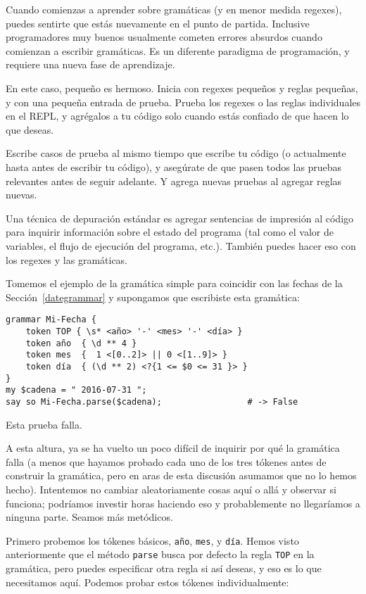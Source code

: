 Cuando comienzas a aprender sobre gramáticas (y en menor medida regexes),
puedes sentirte que estás nuevamente en el punto de partida. Inclusive
programadores muy buenos usualmente cometen errores absurdos cuando
comienzan a escribir gramáticas. Es un diferente paradigma de programación,
y requiere una nueva fase de aprendizaje.

En este caso, pequeño es hermoso. Inicia con regexes pequeños y reglas pequeñas,
y con una pequeña entrada de prueba. Prueba los regexes o las reglas individuales
en el REPL, y agrégalos a tu código solo cuando estás confiado
de que hacen lo que deseas.

Escribe casos de prueba al mismo tiempo que escribe tu código 
(o actualmente hasta antes de escribir tu código), y asegúrate de
que pasen todos las pruebas relevantes antes de seguir adelante.
Y agrega nuevas pruebas al agregar reglas nuevas.


Una técnica de depuración estándar es agregar sentencias de 
impresión al código para inquirir información sobre el estado
del programa (tal como el valor de variables, el flujo de
ejecución del programa, etc.). También puedes hacer eso con
los regexes y las gramáticas.

Tomemos el ejemplo de la gramática simple para coincidir
con las fechas de la Sección~\ref{dategrammar} y supongamos
que escribiste esta gramática:

\begin{verbatim}
grammar Mi-Fecha {
    token TOP { \s* <año> '-' <mes> '-' <día> }
    token año  { \d ** 4 }                                        
    token mes  {  1 <[0..2]> || 0 <[1..9]> }                
    token día  { (\d ** 2) <?{1 <= $0 <= 31 }> }  
}                         
my $cadena = " 2016-07-31 ";
say so Mi-Fecha.parse($cadena);                 # -> False
\end{verbatim}

Esta prueba falla.

A esta altura, ya se ha vuelto un poco difícil de inquirir
por qué la gramática falla (a menos que hayamos probado cada
uno de los tres tókenes antes de construir la gramática,
pero en aras de esta discusión asumamos que no lo hemos hecho).
Intentemos no cambiar aleatoriamente cosas aquí o allá y observar
si funciona; podríamos investir horas haciendo eso y probablemente
no llegaríamos a ninguna parte. Seamos más metódicos.

Primero probemos los tókenes básicos, {\tt año}, {\tt mes}, y {\tt día}.
Hemos visto anteriormente que el método {\tt parse} busca por defecto
la regla {\tt TOP} en la gramática, pero puedes especificar otra 
regla si así deseas, y eso es lo que necesitamos aquí. 
Podemos probar estos tókenes individualmente:

